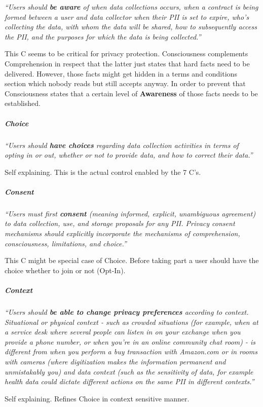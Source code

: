 \emph{``Users should \textbf{be aware} of when data collections occurs,
when a contract is being formed between a user and data collector when
their PII is set to expire, who's collecting the data, with whom the
data will be shared, how to subsequently access the PII, and the
purposes for which the data is being collected.''}

This C seems to be critical for privacy protection. Consciousness
complements Comprehension in respect that the latter just states that
hard facts need to be delivered. However, those facts might get hidden
in a terms and conditions section which nobody reads but still accepts
anyway. In order to prevent that Consciousness states that a certain
level of \textbf{Awareness} of those facts needs to be established.

\subparagraph{Choice}

\emph{``Users should \textbf{have choices} regarding data collection
activities in terms of opting in or out, whether or not to provide data,
and how to correct their data.''}

Self explaining. This is the actual control enabled by the 7 C's.

\subparagraph{Consent}

\emph{``Users must first \textbf{consent} (meaning informed, explicit,
unambiguous agreement) to data collection, use, and storage proposals
for any PII. Privacy consent mechanisms should explicitly incorporate
the mechanisms of comprehension, consciousness, limitations, and
choice.''}

This C might be special case of Choice. Before taking part a user should
have the choice whether to join or not (Opt-In).

\subparagraph{Context}

\emph{``Users should \textbf{be able to change privacy preferences}
according to context. Situational or physical context - such as crowded
situations (for example, when at a service desk where several people
can listen in on your exchange when you provide a phone number, or when
you're in an online community chat room) - is different from when you
perform a buy transaction with Amazon.com or in rooms with cameras
(where digitization makes the information permanent and unmistakably
you) and data context (such as the sensitivity of data, for example
health data could dictate different actions on the same PII in different
contexts.''}

Self explaining. Refines Choice in context sensitive manner.

